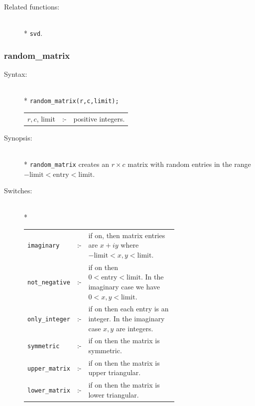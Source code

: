 {\begin{description}
\item[Related functions:]\mbox{}\\*
\texttt{svd}.
\end{description}

\subsubsection{random\_matrix}
\label{linalg:random_matrix}
\hypertarget{operator:RANDOM_MATRIX}{}

\begin{description}
\item[Syntax:]\mbox{}\\*
\texttt{random\_matrix(r,c,limit);}\\[2mm]
\begin{tabular}{l l l}
$r,c$, limit &:-& positive integers. \\
\end{tabular}

\item[Synopsis:]\mbox{}\\*
\texttt{random\_matrix} creates an $r\times c$ matrix with random entries in the
range $-\text{limit} < \text{entry} < \text{limit}$.

\hypertarget{switch:IMAGINARY}{}
\hypertarget{switch:NOT_NEGATIVE}{}
\hypertarget{switch:ONLY_INTEGER}{}
\hypertarget{switch:SYMMETRIC}{}
\hypertarget{switch:LOWER_MATRIX}{}
\hypertarget{switch:UPPER_MATRIX}{}
\item[Switches:]\mbox{}\\*
\begin{tabular}{l l p{0.65\linewidth}}
\texttt{imaginary}  &:-& if
on, then matrix entries are $x+iy$ where $-\text{limit} < x,y < \text{limit}$.\\
\texttt{not\_negative} &:-& if on then $0 <
\text{entry} < \text{limit}$. In the imaginary case we have $0<x,y<\text{limit}$.\\
\texttt{only\_integer} &:-& if on then each
entry is an integer. In the imaginary case $x,y$ are integers.\\
\texttt{symmetric} &:-& if on then the matrix is symmetric. \\
\texttt{upper\_matrix} &:-& if on then the
matrix is upper triangular. \\
\texttt{lower\_matrix} &:-& if on then the matrix is lower triangular.
\end{tabular}


\end{description}}
